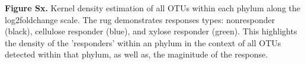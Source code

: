 \textbf{Figure Sx.} Kernel density estimation of all OTUs within each phylum along the log2foldchange scale. The rug demonstrates responses types: nonresponder (black), cellulose responder (blue), and xylose responder (green). This highlights the density of the 'responders' within an phylum in the context of all OTUs detected within that phylum, as well as, the maginitude of the response.   
